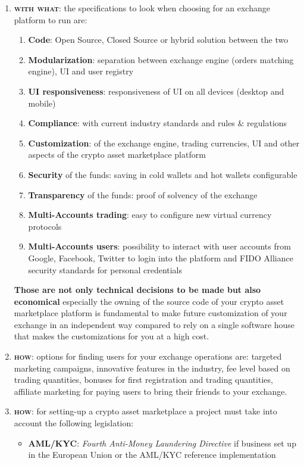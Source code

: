 \documentclass[11pt,fleqn]{book} %
\begin{document}
\begin{enumerate}
	\item \textbf{\textsc{with what}}: the specifications to look when choosing for an exchange platform to run are:
		\begin{enumerate}[label*=\arabic*.]
			\item \textbf{Code}: Open Source, Closed Source or hybrid solution between the two
			\item \textbf{Modularization}: separation between exchange engine (orders matching engine), UI and user registry
			\item \textbf{UI responsiveness}: responsiveness of UI on all devices (desktop and mobile)
			\item \textbf{Compliance}: with current industry standards and rules \& regulations
			\item \textbf{Customization}: of the exchange engine, trading currencies, UI and other aspects of the crypto asset marketplace platform
			\item \textbf{Security} of the funds: saving in cold wallets and hot wallets configurable
			\item \textbf{Transparency} of the funds: proof of solvency of the exchange
			\item \textbf{Multi-Accounts trading}: easy to configure new virtual currency protocols
			\item \textbf{Multi-Accounts users}: possibility to interact with user accounts from Google, Facebook, Twitter 
			to login into the platform and FIDO Alliance security standards for personal credentials
		\end{enumerate}	
	\textbf{Those are not only technical decisions to be made but also economical} especially the owning of the source code of your crypto asset
	marketplace platform is fundamental to make future customization of your exchange in an independent way compared to rely on a single
	software house that makes the customizations for you at a high cost.
	\item \textbf{\textsc{how}}: options for finding users for your exchange operations are: targeted marketing campaigns, innovative features in the industry,
	fee level based on trading quantities, bonuses for first registration and trading quantities, affiliate marketing for paying users to bring their friends
	to your exchange.
	\item \textbf{\textsc{how}}: for setting-up a crypto asset marketplace a project must take into account the following legislation:
		\begin{itemize}
			\item \textbf{AML/KYC}: \textit{Fourth Anti-Money Laundering Directive} if business set up in the European Union \cite{4AMLD} or the AML/KYC reference implementation

\end{itemize}
\end{enumerate}
\end{document}
